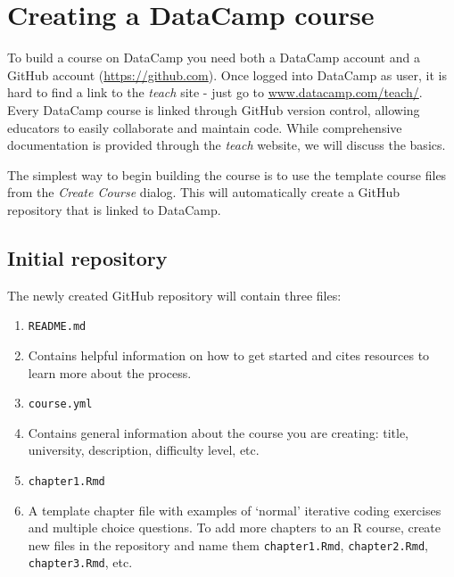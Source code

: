\documentclass{tise_style_doi}
\begin{document}
\section{Creating a DataCamp course}
\label{creating}


To build a course on DataCamp you need both a DataCamp account and a GitHub account
(\url{https://github.com}). Once logged into DataCamp as user, it is hard to find a link
to the \emph{teach} site - just go to \url{www.datacamp.com/teach/}.
Every DataCamp course is linked through GitHub version control, allowing educators to
easily collaborate and maintain code. While comprehensive documentation is provided
through the \emph{teach} website, we will discuss the basics.

The simplest way to begin building the course is to use the template course files from
the \textit{Create Course} dialog. This will automatically create a GitHub repository
that is linked to DataCamp.

\subsection{Initial repository}

The newly created GitHub repository will contain three files:
\begin{enumerate}
\item \texttt{README.md}
\item[] Contains helpful information on how to get started and cites resources to
learn more about the process.
\item \texttt{course.yml}
\item[] Contains general information about the course you are creating: title, university,
description, difficulty level, etc.
\item \texttt{chapter1.Rmd}
\item[] A template chapter file with examples of `normal' iterative coding exercises and
multiple choice questions.  To add more chapters to an R course, create new files in the repository
and name them \texttt{chapter1.Rmd}, \texttt{chapter2.Rmd}, \texttt{chapter3.Rmd}, etc.
\end{enumerate}
\end{document}
